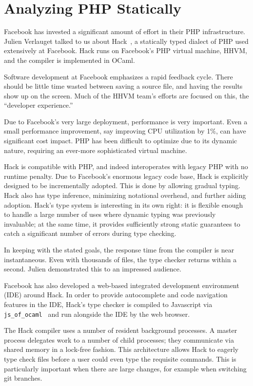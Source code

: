 \documentclass{jfp1}
\begin{document}
\section{Analyzing PHP Statically}


Facebook has invested a significant amount of effort in their PHP
infrastructure. Julien Verlauget talked to us about
Hack~\cite{Verlaguet:2014:Hack}, a statically typed dialect of PHP
used extensively at Facebook. Hack runs on Facebook's PHP virtual
machine, HHVM, and the compiler is implemented in OCaml.

Software development at Facebook emphasizes a rapid feedback cycle.
There should be little time wasted between saving a source file, and
having the results show up on the screen. Much of the HHVM team's
efforts are focused on this, the ``developer experience.''

Due to Facebook's very large deployment, performance is very important.
Even a small performance improvement, say improving CPU utilization 
by 1\%, can have significant cost impact. PHP has been difficult to optimize
due to its dynamic nature, requiring an ever-more sophisticated 
virtual machine.

Hack is compatible with PHP, and indeed interoperates with legacy PHP
with no runtime penalty. Due to Facebook's enormous legacy code base, 
Hack is explicitly designed to be incrementally adopted. This is done
by allowing gradual typing. Hack also has type inference, minimizing
notational overhead, and further aiding adoption. Hack's type system
is interesting in its own right: it is flexible enough to handle a large
number of uses where dynamic typing was previously invaluable; at
the same time, it provides sufficiently strong static guarantees to catch
a significant number of errors during type checking.

In keeping with the stated goals, the response time from the compiler
is near instantaneous. Even with thousands of files, the type checker 
returns within a second. Julien demonstrated this to an impressed 
audience.

Facebook has also developed a web-based integrated development
environment (IDE) around Hack. In order to provide autocomplete and
code navigation features in the IDE, Hack's type checker is compiled 
to Javascript via \texttt{js\_of\_ocaml}~\cite{DBLP:journals/spe/VouillonB14} and run alongside the 
IDE by the web browser.

The Hack compiler uses a number of resident background processes. A
master process delegates work to a number of child processes; they
communicate via shared memory in a lock-free fashion. This
architecture allows Hack to eagerly type check files before a user
could even type the requisite commands. This is particularly important
when there are large changes, for example when switching git branches.
\end{document}
